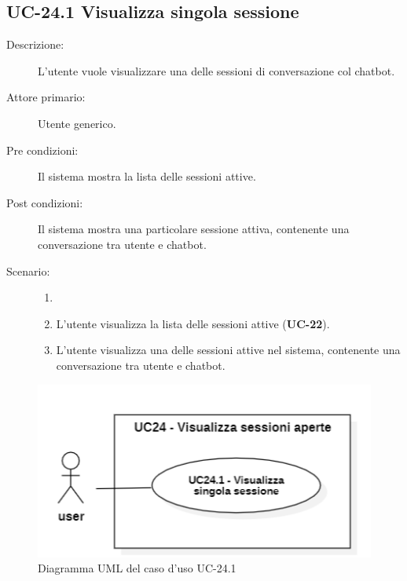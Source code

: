 \subsection{UC-24.1 Visualizza singola sessione}
\begin{description}
    \item[Descrizione:] L'utente vuole visualizzare una delle sessioni di conversazione col chatbot.
    \item[Attore primario:] Utente generico.
    \item[Pre condizioni:] Il sistema mostra la lista delle sessioni attive.
    \item[Post condizioni:] Il sistema mostra una particolare sessione attiva, contenente una conversazione tra utente e chatbot.
    \item[Scenario:] 
    \begin{enumerate}
        \item[]
        \item L'utente visualizza la lista delle sessioni attive (\textbf{UC-22}).
        \item L'utente visualizza una delle sessioni attive nel sistema, contenente una conversazione tra utente e chatbot.
    \end{enumerate}
\end{description}

\begin{figure}[H]
    \centering
    \includegraphics[width=0.8\linewidth]{UC24.1.PNG}
    \caption{Diagramma UML del caso d'uso UC-24.1}
\end{figure}

